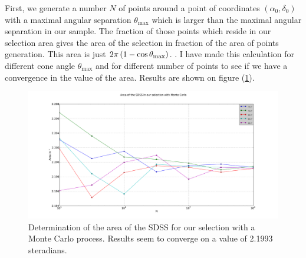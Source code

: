 First, we generate a number $N$ of points around a point of coordinates
$(\alpha_0, \delta_0)$ with a maximal angular separation $\theta_{\max}$ which
is larger than the maximal angular separation in our sample. The fraction of
those points which reside in our selection area gives the area of the selection
in fraction of the area of points generation. This area is just
$2\pi\left(1-\cos\theta_{\max}\right)$. . I have made this calculation for
different cone angle $\theta_{\max}$ and for different number of points
to see if we have a convergence in the value of the area. Results are shown on
figure (\ref{fig:sdss_area}).
\begin{figure}[htb]
    \centering
    \includegraphics[width=\linewidth]{figures/sdss/SDSS_area}
    \caption{Determination of the area of the SDSS for our selection with a
    Monte Carlo process. Results seem to converge on a value of 2.1993
steradians.}
\label{fig:sdss_area}\end{figure}
